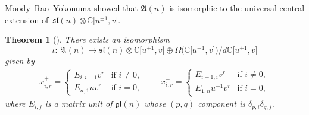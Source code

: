 \documentclass[10pt,a4paper]{amsart}
\numberwithin{equation}{section}
\newtheorem{Theorem}{Theorem}[section]
\theoremstyle{definition}
\begin{document}
Moody--Rao--Yokonuma showed that $\mathfrak{A}(n)$ is isomorphic to the universal central extension of~$\mathfrak{sl}(n)\otimes\mathbb{C}\bigl[u^{\pm1},v\bigr]$.
\begin{Theorem}[{\cite[Proposition 3.5]{MRY}}]
There exists an isomorphism
\begin{equation*}
\iota\colon\ \mathfrak{A}(n)\to \mathfrak{sl}(n)\otimes\mathbb{C}\bigl[u^{\pm1},v\bigr]\oplus\Omega\bigl(\mathbb{C}\bigl[u^{\pm1},v\bigr]\bigr)/d\mathbb{C}\bigl[u^{\pm1},v\bigr]
\end{equation*}
given by
\begin{gather*}
x^+_{i,r}=\begin{cases}
E_{i,i+1}v^r&\text{if }i\neq0,\\
E_{n,1}uv^r&\text{if }i=0,
\end{cases}\qquad
x^-_{i,r}=\begin{cases}
E_{i+1,i}v^r&\text{if }i\neq0,\\
E_{1,n}u^{-1}v^r&\text{if }i=0,
\end{cases}
\end{gather*}
where $E_{i,j}$ is a matrix unit of $\mathfrak{gl}(n)$ whose $(p,q)$ component is $\delta_{p,i}\delta_{q,j}$.
\end{Theorem}
\end{document}
